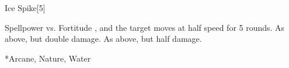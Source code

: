 \begin{spellsection}{Ice Spike}[5]
    \begin{spellheader}
    \end{spellheader}
    \begin{spellcontent}
        \begin{spelltargetinginfo}
        \end{spelltargetinginfo}
        \begin{spelleffects}
            \begin{spellattack}{Spellpower vs. Fortitude}
                \spellsuccess {}, and the target moves at half speed for 5 rounds.
                \spellcritical As above, but double damage.
                \spellfailure As above, but half damage.
            \end{spellattack}
        \end{spelleffects}
    \end{spellcontent}
    \begin{spellfooter}
        *{Arcane, Nature, Water}
        \miscastexplode
    \end{spellfooter}
    \begin{spellaugments}
    \end{spellaugments}
\end{spellsection}

